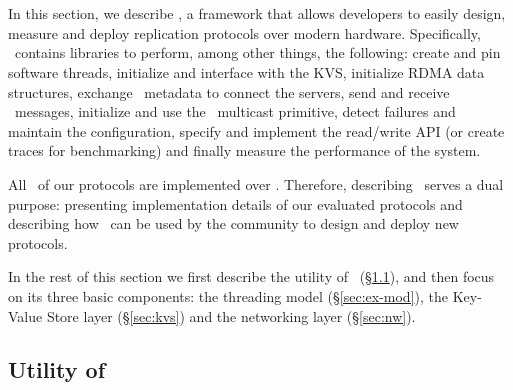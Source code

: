 \section{\odlib}
\label{sec:od}


In this section, we 
describe \odlib, a framework that allows developers to easily design, measure and deploy replication protocols over modern hardware.
Specifically, \odlib~contains libraries to perform, among other things, the following:
create and pin software threads, initialize and interface with the KVS, initialize RDMA data structures, exchange \RDMA~metadata to connect the servers, send and receive \RDMA~messages, initialize and use the \RDMA~multicast primitive, detect failures and maintain the configuration, specify and implement the read/write API (or create traces for benchmarking) and finally measure the performance of the system. %

All \pnum~of our protocols are implemented over \odlib.
Therefore, describing \odlib~serves a dual purpose: presenting implementation details of our evaluated protocols and describing how \odlib~can be used by the community to design and deploy new protocols.

In the rest of this section we first describe the utility of \odlib\ (\S\ref{sec:why}), and then focus on its three basic components: the threading model (\S\ref{sec:ex-mod}), the Key-Value Store layer (\S\ref{sec:kvs}) and the networking layer (\S\ref{sec:nw}).

\subsection{Utility of \odlib}\label{sec:why}

